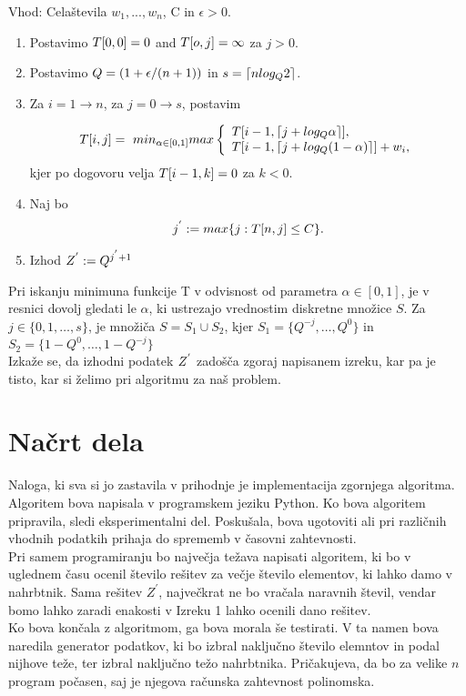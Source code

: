 \documentclass[a4paper,15pt]{article}
\begin{document}
\begin{framed}
Vhod: Celaštevila \(w_{1},...,w_{n}\), C in \( \epsilon > 0\).
\begin{enumerate}
\item Postavimo \(\uppercase{t}[0,0] = 0\) and \(\uppercase{t}[o,j] = \infty \) za \(j > 0\).
\item Postavimo \( \uppercase{q} = ( 1+ \epsilon/(n + 1))\) in \( s= \lceil n log_{\uppercase{q}}2 \rceil\).
\item Za \( i = 1 \to n\), za \( j = 0 \to s \), postavim

\[ 
\uppercase{t}[i, j]=\ min_{\alpha \in [0,1]} max \left\{
\begin{array}{ll}
      \uppercase{t}[i - 1, \lceil j + log_{\uppercase{q}}\alpha \rceil ], \\
      \uppercase{t}[i - 1, \lceil j + log_{\uppercase{q}}(1 - \alpha) \rceil ] + w_{i}, 
      
\end{array} 
\right. 
\]
kjer po dogovoru velja \( \uppercase{t}[i - 1, k] = 0 \) za \( k <0\).

\item Naj bo
\[
j^{'} := max\{j : \uppercase{t}[n, j] \leq \uppercase{C} \}.
\]
\item Izhod \(\uppercase{Z}^{'} := \uppercase{Q}^{j^{'} + 1} \)
\end{enumerate}
\end{framed}



\noindent Pri iskanju minimuna funkcije T v odvisnost od parametra $\alpha \in [0,1]$, je v resnici dovolj gledati le $\alpha$, ki ustrezajo vrednostim diskretne množice $S$. Za $ j \in \{0, 1, \ldots, s\}$, je množiča $S = S_{1} \cup S_{2}$, kjer $S_{1} = \{Q^{-j}, \ldots, Q^0\}$ in $S_{2} = \{1-Q^{0}, \ldots, 1- Q^{-j}\}$ \\
\noindent Izkaže se, da izhodni podatek \(\uppercase{z}^{'}\) zadošča zgoraj napisanem izreku, kar pa je tisto, kar si želimo pri algoritmu za naš problem.

\newpage
\section{Načrt dela}

\noindent Naloga, ki sva si jo zastavila v prihodnje je implementacija zgornjega algoritma. Algoritem bova napisala v programskem jeziku Python.
Ko bova algoritem pripravila, sledi eksperimentalni del. Poskušala, bova ugotoviti ali pri različnih vhodnih podatkih prihaja do sprememb v časovni zahtevnosti. 
  \\
Pri samem programiranju bo največja težava napisati algoritem, ki bo v uglednem času ocenil število rešitev za večje število elementov, ki lahko damo v nahrbtnik. Sama rešitev $Z^{'}$, največkrat ne bo vračala naravnih števil, vendar bomo lahko zaradi enakosti v Izreku 1 lahko ocenili dano rešitev.
\\ Ko bova končala z algoritmom, ga bova morala še testirati. V ta namen bova naredila generator podatkov, ki bo izbral naključno število elemntov in podal nijhove teže, ter izbral naključno težo nahrbtnika. Pričakujeva, da bo za velike $n$ program počasen, saj je njegova računska zahtevnost polinomska.
\end{document}
